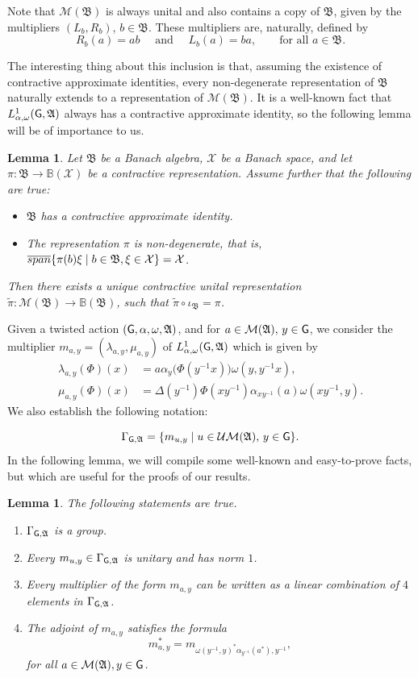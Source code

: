 \documentclass[11pt]{article}
\newcommand{\A}{\mathfrak{A}}
\newcommand{\B}{\mathfrak{B}}
\def\X{\mathcal{X}}
\def\G{{\sf G}}
\newtheorem{lem}[thm]{Lemma}
\theoremstyle{definition}
\theoremstyle{remark}
\numberwithin{equation}{section}
\numberwithin{equation}{section}
\begin{document}
Note that $\mathcal M(\B)$ is always unital and also contains a copy of $\B$, given by the multipliers $(L_b,R_b)$, $b\in\B$. These multipliers are, naturally, defined by
$$
R_b(a)=ab\quad\text{ and }\quad L_b(a)=ba,\quad\quad\text{for all }a\in\B.
$$

The interesting thing about this inclusion is that, assuming the existence of contractive approximate identities, every non-degenerate representation of $\B$ naturally extends to a representation of $\mathcal M(\B)$. It is a well-known fact that $L^1_{\alpha,\omega}(\G,\A)$ always has a contractive approximate identity, so the following lemma will be of importance to us.

\begin{lem}\label{exten}
Let $\B$ be a Banach algebra, $\X$ be a Banach space, and let $\pi:\B\to \mathbb B(\X)$ be a contractive representation. Assume further that the following are true: \begin{itemize}
\item[(i)] $\B$ has a contractive approximate identity.
\item[(ii)] The representation $\pi$ is non-degenerate, that is, $\overline{\rm span}\{\pi(b)\xi\mid b\in\B, \xi\in \X\}=\X$.
\end{itemize}
Then there exists a unique contractive unital representation $\widetilde\pi: \mathcal M(\B)\to \mathbb B(\B)$, such that $\widetilde\pi\circ\iota_\B=\pi$.
\end{lem}


Given a twisted action $(\G,\alpha,\omega,\A)$, and for $a\in \mathcal{M}(\A),\, y\in\G$, we consider the multiplier $m_{a,y}=(\lambda_{a,y},\mu_{a,y})$ of $L^1_{\alpha,\omega}(\G,\A)$ which is given by 
\begin{align*}
\lambda_{a,y}(\Phi)(x)&=a\alpha_y\big(\Phi(y^{-1}x)\big)\omega(y,y^{-1}x), \\
\mu_{a,y}(\Phi)(x)&=\Delta(y^{-1})\Phi(xy^{-1})\alpha_{xy^{-1}}(a)\omega(xy^{-1},y).
\end{align*}
We also establish the following notation:

$$
\Gamma_{\G,\A}= \{m_{u,y}\mid u\in \mathcal{UM}(\A),\, y\in\G\}.
$$
In the following lemma, we will compile some well-known and easy-to-prove facts, but which are useful for the proofs of our results.

\begin{lem}\label{easy} The following statements are true.
\begin{enumerate}
\item[(i)] $\Gamma_{\G,\A}$ is a group.
\item[(ii)] Every $m_{u,y}\in \Gamma_{\G,\A}$ is unitary and has norm $1$.
\item[(iii)] Every multiplier of the form $m_{a,y}$ can be written as a linear combination of $4$ elements in $\Gamma_{\G,\A}$.
\item[(iv)] The adjoint of $m_{a,y}$ satisfies the formula \begin{equation}\label{inv}
m_{a,y}^{*}=m_{\omega(y^{-1},y)^*\alpha_{y^{-1}}(a^*),y^{-1}},
\end{equation} for all $a\in\mathcal{M}(\A), y\in\G$.
\end{enumerate}
\end{lem}
\end{document}
